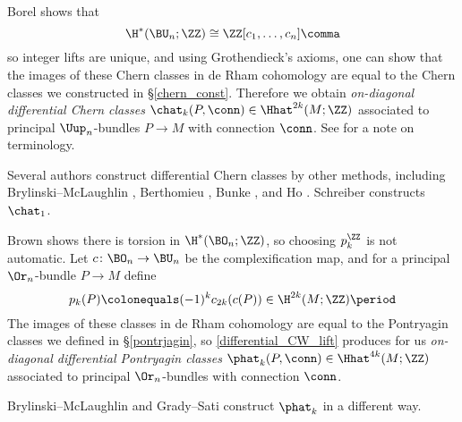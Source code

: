 \begin{example}
\label{differential_Chern}
Borel \cite[\S 29]{Bor53} shows that
\begin{equation*}
	\H^*(\BU_n;\ZZ)\cong \ZZ[c_1,\dotsc, c_n] \comma
\end{equation*}
so integer lifts are unique, and using Grothendieck's axioms, one can show that the images of these Chern classes in de Rham
cohomology are equal to the Chern classes we constructed in \S\ref{chern_const}. Therefore we obtain
\emph{on-diagonal differential Chern classes} $\chat_k(P, \conn)\in\Hhat^{2k}(M; \ZZ)$ associated to principal
$\Uup_n$-bundles $P\to M$ with connection $\conn$. 
See  for a note on terminology.

Several authors construct differential Chern classes by other methods, including
Brylinski--McLaughlin \cite{BM96},
Berthomieu \cite{Ber10},
Bunke \cite{Bun10,Bunke:notes}, and
Ho \cite{Ho15}. Schreiber \cite{Urs} constructs $\chat_1$.

\end{example}
\begin{example}
\label{differential_Pontryagin}
	Brown \cite[Theorem 1.6]{Bro82} shows there is torsion in $\H^*(\BO_n; \ZZ)$, so choosing $p_k^\ZZ$ is not
	automatic. Let $c\colon\BO_n\to\BU_n$ be the complexification map, and for a principal
	$\Or_n$-bundle $P\to M$ define
	\begin{equation}
		p_k(P) \colonequals (-1)^k c_{2k}(c(P))\in \H^{2k}(M; \ZZ)\period
	\end{equation}
	The images of these classes in de Rham cohomology are equal to the Pontryagin classes we defined in
	\S\ref{pontrjagin},
	so \cref{differential_CW_lift} produces for us
	\emph{on-diagonal differential Pontryagin classes} $\phat_k(P,  \conn)\in\Hhat^{4k}(M;\ZZ)$ associated to
	principal $\Or_n$-bundles with connection $\conn$.

	Brylinski--McLaughlin \cite{BM96} and Grady--Sati \cite[Proposition 3.6]{GS21} construct $\phat_k$ in a
	different way.
\end{example}

